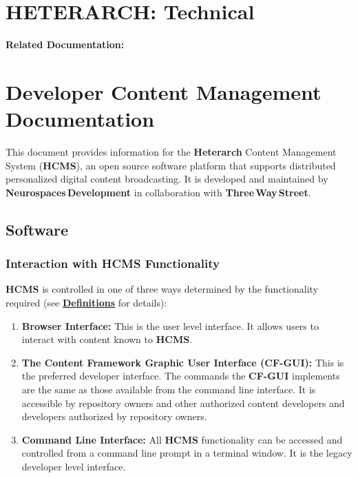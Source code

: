 \documentclass[12pt]{article}
\begin{document}
\section*{HETERARCH: Technical}

{\bf Related Documentation:}

\section*{Developer Content Management Documentation}

This document provides information for the {\bf \small Heterarch} Content Management System ({\bf \small HCMS}), an open source software platform that supports distributed personalized digital content broadcasting. It is developed and maintained by {\bf Neurospaces\,Development} in collaboration with {\bf Three\,Way\,Street}.

\subsection*{Software}

\subsubsection*{Interaction with {\bf \small HCMS} Functionality}

{\bf \small HCMS} is controlled in one of three ways determined by the functionality required (see \href{../heterarch-overview/heterarch-overview.tex}{\bf Definitions} for details):

\begin{enumerate}
\item{\bf Browser Interface:} This is the user level interface. It allows users to interact with content known to {\bf \small HCMS}.
\item {\bf The Content Framework Graphic User Interface (CF-GUI):} This is the preferred developer interface. The commands the {\bf \small CF-GUI} implements are the same as those available from the command line interface. It is accessible by repository owners and other authorized content developers and developers authorized by repository owners.
\item {\bf Command Line Interface:} All {\bf \small HCMS} functionality can be accessed and controlled from a command line prompt in a terminal window. It is the legacy developer level interface.
\end{enumerate}
\end{document}
